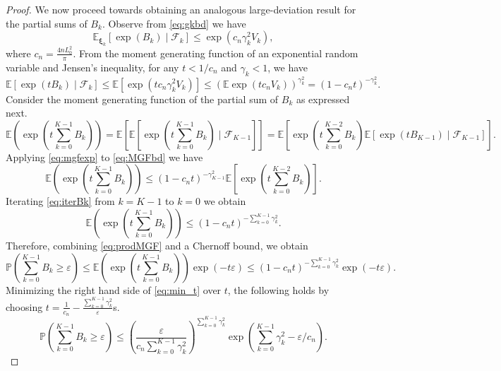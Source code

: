 \documentclass[11pt,reqno]{amsart}
\newcommand{\1}{{\bf 1}}
\newcommand{\2}{{\bf 2}}
\newcommand{\bxi}{\boldsymbol{\xi}}
\newcommand{\E}{\mathbb E}
\newcommand{\cf}{\mathcal F}
\newcommand{\lp}{\left(}
\newcommand{\rp}{\right)}
\newcommand{\lc}{\left[}
\newcommand{\rc}{\right]}
\numberwithin{equation}{section}
\theoremstyle{remark}
\begin{document}
{\begin{proof}
		We now proceed towards obtaining an analogous large-deviation result for the partial sums of $B_k$. Observe from \eqref{eq:gkbd} we have
		\begin{equation*}%
			\E_{\bxi_k} \lc \exp(B_k)\mid \cf_k \rc \leq \exp(c_n\gamma_k^2 V_k),
		\end{equation*} 
		where $c_n=\frac{4nL_0^2}{\pi}$. From the moment generating function of an exponential random variable and Jensen's inequality,  for any $t < 1/c_n$ and $\gamma_k<1$, we have
		\begin{equation}\label{eq:mgfexp}
			\E \lc \exp(tB_k)\mid \cf_k \rc \leq \E \lc\exp(tc_n\gamma_k^2 V_k)\rc\leq\left(\E\exp\left(tc_nV_k\right)\right)^{\gamma_k^2}=(1-c_nt)^{-\gamma_k^2}.
		\end{equation}
		Consider the moment generating function of {the partial sum of $B_k$ as expressed next.}
		{\small
			\begin{equation}\label{eq:MGFbd}
				\E\left(\exp\left(t\sum_{k=0}^{K-1}B_k\right)\right)=\E \lc\E\left[\exp\left(t\sum_{k=0}^{K-1}B_k \right)\mid \cf_{K-1}\right] \rc=\E\left[\exp\left(t\sum_{k=0}^{K-2}B_k \right)\E\lc\exp\lp tB_{K-1}\rp\mid \cf_{K-1}\rc\right].
		\end{equation}}
		Applying \eqref{eq:mgfexp} to \eqref{eq:MGFbd} we have
		\begin{equation}\label{eq:iterBk}
			\E\left(\exp\left(t\sum_{k=0}^{K-1}B_k\right)\right)\leq (1-c_nt)^{-\gamma_{K-1}^2}\E\lc\exp\left(t\sum_{k=0}^{K-2}B_k \right)\rc.
		\end{equation}
		Iterating \eqref{eq:iterBk} from $k=K-1$ to $k=0$ we obtain
		\begin{equation}\label{eq:prodMGF}
			\E\left(\exp\left(t\sum_{k=0}^{K-1}B_k\right)\right)\leq\left(1-c_nt\right)^{-\sum_{k=0}^{K-1}\gamma_k^2}.
		\end{equation}
		Therefore, combining \eqref{eq:prodMGF} and a Chernoff bound, we obtain 
		\begin{equation}\label{eq:min_t}
			\mathbb{P}\left(\sum_{k=0}^{K-1}B_k \geq \varepsilon\right)\leq \E\left(\exp\left(t\sum_{k=0}^{K-1}B_k\right)\right)\exp(-t\varepsilon)\leq\left(1-c_nt\right)^{-\sum_{k=0}^{K-1}\gamma_k^2}\exp(-t\varepsilon).
		\end{equation}
		Minimizing the right hand side of \eqref{eq:min_t}  over $t$, the following holds by choosing $t=\frac{1}{c_n}-\frac{\sum_{k=0}^{K-1}\gamma_k^2}{\varepsilon}$s.
		\begin{equation}\label{eq:Bk}
			\mathbb{P}\left(\sum_{k=0}^{K-1}B_k \geq \varepsilon\right)\leq \left(\frac{\varepsilon}{c_n\sum_{k=0}^{K-1}\gamma_k^2}\right)^{\sum_{k=0}^{K-1}\gamma_k^2}\exp\left(\sum_{k=0}^{K-1}\gamma_k^2-\varepsilon/c_n\right).

\end{equation}
\end{proof}}
\end{document}
